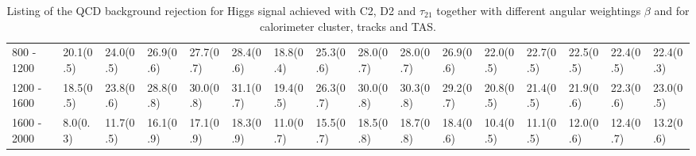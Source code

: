\begin{table}
{\begin{tabular}{llllllllllllllll}
\multicolumn{1}{l||}{800 - 1200}     & \multicolumn{1}{l|}{20.1(0.5)}        & \multicolumn{1}{l|}{24.0(0.5)} 		& \multicolumn{1}{l|}{26.9(0.6)} 		& \multicolumn{1}{l|}{27.7(0.7)} 								& \multicolumn{1}{l||}{28.4(0.6)} 	& \multicolumn{1}{l|}{18.8(0.4)}        	& \multicolumn{1}{l|}{25.3(0.6)} 	& \multicolumn{1}{l|}{28.0(0.7)} 						& \multicolumn{1}{l|}{28.0(0.7)} 					& \multicolumn{1}{l||}{26.9(0.6)} 						& \multicolumn{1}{l|}{22.0(0.5)}        & \multicolumn{1}{l|}{22.7(0.5)} 	& \multicolumn{1}{l|}{22.5(0.5)} 	& \multicolumn{1}{l|}{22.4(0.5)} 	& \multicolumn{1}{l|}{22.4(0.3)} \\
\multicolumn{1}{l||}{1200 - 1600}    & \multicolumn{1}{l|}{18.5(0.5)}        & \multicolumn{1}{l|}{23.8(0.6)} 		& \multicolumn{1}{l|}{28.8(0.8)} 		& \multicolumn{1}{l|}{30.0(0.8)} 								& \multicolumn{1}{l||}{31.1(0.7)} 						& \multicolumn{1}{l|}{19.4(0.5)}        	& \multicolumn{1}{l|}{26.3(0.7)} 	& \multicolumn{1}{l|}{30.0(0.8)} 						& \multicolumn{1}{l|}{30.3(0.8)} 	& \multicolumn{1}{l||}{29.2(0.7)} 						& \multicolumn{1}{l|}{20.8(0.5)}        & \multicolumn{1}{l|}{21.4(0.5)} 	& \multicolumn{1}{l|}{21.9(0.6)} 	& \multicolumn{1}{l|}{22.3(0.6)} 	& \multicolumn{1}{l|}{23.0(0.5)} \\
\multicolumn{1}{l||}{1600 - 2000}    & \multicolumn{1}{l|}{8.0(0.3)}         & \multicolumn{1}{l|}{11.7(0.5)} 		& \multicolumn{1}{l|}{16.1(0.9)} 		& \multicolumn{1}{l|}{17.1(0.9)} 								& \multicolumn{1}{l||}{18.3(0.9)} 						& \multicolumn{1}{l|}{11.0(0.7)}        	& \multicolumn{1}{l|}{15.5(0.7)} 	& \multicolumn{1}{l|}{18.5(0.8)} 						& \multicolumn{1}{l|}{18.7(0.8)} 	& \multicolumn{1}{l||}{18.4(0.6)} 						& \multicolumn{1}{l|}{10.4(0.5)}        & \multicolumn{1}{l|}{11.1(0.5)} 	& \multicolumn{1}{l|}{12.0(0.6)} 	& \multicolumn{1}{l|}{12.4(0.7)} 	& \multicolumn{1}{l|}{13.2(0.6)} \\ \hline
\end{tabular}}
\caption{Listing of the QCD background rejection for Higgs signal achieved with C2, D2 and $\tau_{21}$ together with different angular weightings $\beta$ and for calorimeter cluster, tracks and TAS.}\label{table:higgs_scan}
\end{table}

